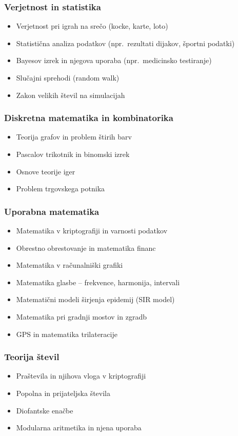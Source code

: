 \documentclass[11pt,a4paper]{article}
\begin{document}
\subsubsection*{Verjetnost in statistika}
\begin{itemize}
  \item Verjetnost pri igrah na srečo (kocke, karte, loto)
  \item Statistična analiza podatkov (npr.\ rezultati dijakov, športni podatki)
  \item Bayesov izrek in njegova uporaba (npr.\ medicinsko testiranje)
  \item Slučajni sprehodi (random walk)
  \item Zakon velikih števil na simulacijah
\end{itemize}

\subsubsection*{Diskretna matematika in kombinatorika}
\begin{itemize}
  \item Teorija grafov in problem štirih barv
  \item Pascalov trikotnik in binomski izrek
  \item Osnove teorije iger
  \item Problem trgovskega potnika
\end{itemize}

\subsubsection*{Uporabna matematika}
\begin{itemize}
  \item Matematika v kriptografiji in varnosti podatkov
  \item Obrestno obrestovanje in matematika financ
  \item Matematika v računalniški grafiki
  \item Matematika glasbe -- frekvence, harmonija, intervali
  \item Matematični modeli širjenja epidemij (SIR model)
  \item Matematika pri gradnji mostov in zgradb
  \item GPS in matematika trilateracije
\end{itemize}

\subsubsection*{Teorija števil}
\begin{itemize}
  \item Praštevila in njihova vloga v kriptografiji
  \item Popolna in prijateljska števila
  \item Diofantske enačbe
  \item Modularna aritmetika in njena uporaba
\end{itemize}
\end{document}
